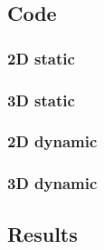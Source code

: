 \documentclass[12pt, a4paper]{article}
\begin{document}
\subsection{Code}

\subsubsection{2D static}

\begin{scriptsize}
\begin{ttfamily}

\end{ttfamily}
\end{scriptsize}

\subsubsection{3D static}

\begin{scriptsize}
\begin{ttfamily}

\end{ttfamily}
\end{scriptsize}

\subsubsection{2D dynamic}

\begin{scriptsize}
\begin{ttfamily}

\end{ttfamily}
\end{scriptsize}

\subsubsection{3D dynamic}

\begin{scriptsize}
\begin{ttfamily}

\end{ttfamily}
\end{scriptsize}

\subsection{Results}
\end{document}
